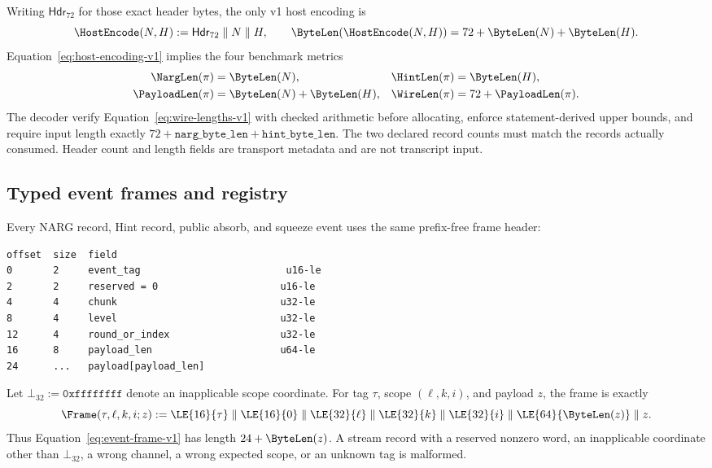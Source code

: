 Writing $\mathsf{Hdr}_{72}$ for those exact header bytes, the only v1 host
encoding is
\begin{equation}
 \HostEncode(N,H)
 :=\mathsf{Hdr}_{72}\parallel N\parallel H,
 \qquad
 \ByteLen(\HostEncode(N,H))=72+\ByteLen(N)+\ByteLen(H).
 \label{eq:host-encoding-v1}
\end{equation}
Equation~\eqref{eq:host-encoding-v1} implies the four benchmark metrics
\begin{equation}
 \begin{aligned}
  \NargLen(\pi)&=\ByteLen(N),&
  \HintLen(\pi)&=\ByteLen(H),\\
  \PayloadLen(\pi)&=\ByteLen(N)+\ByteLen(H),&
  \WireLen(\pi)&=72+\PayloadLen(\pi).
 \end{aligned}
 \label{eq:wire-lengths-v1}
\end{equation}
The decoder \must{} verify Equation~\eqref{eq:wire-lengths-v1} with checked
arithmetic before allocating, enforce statement-derived upper bounds, and
require input length exactly $72+\mathtt{narg\_byte\_len}+
\mathtt{hint\_byte\_len}$.  The two declared record counts must match the
records actually consumed.  Header count and length fields are transport
metadata and are not transcript input.

\subsection{Typed event frames and registry}
\label{sec:wire-events}

Every NARG record, Hint record, public absorb, and squeeze event uses the same
prefix-free frame header:

\begin{lstlisting}[style=wire]
offset  size  field
0       2     event_tag                         u16-le
2       2     reserved = 0                     u16-le
4       4     chunk                            u32-le
8       4     level                            u32-le
12      4     round_or_index                   u32-le
16      8     payload_len                      u64-le
24      ...   payload[payload_len]
\end{lstlisting}

Let $\bot_{32}:=\mathtt{0xffffffff}$ denote an inapplicable scope coordinate.
For tag $\tau$, scope $(\ell,k,i)$, and payload $z$, the frame is exactly
\begin{equation}
 \Frame(\tau,\ell,k,i;z):=
 \LE{16}{\tau}\parallel\LE{16}{0}\parallel
 \LE{32}{\ell}\parallel\LE{32}{k}\parallel\LE{32}{i}\parallel
 \LE{64}{\ByteLen(z)}\parallel z.
 \label{eq:event-frame-v1}
\end{equation}
Thus Equation~\eqref{eq:event-frame-v1} has length $24+\ByteLen(z)$.  A stream
record with a reserved nonzero word, an inapplicable coordinate other than
$\bot_{32}$, a wrong channel, a wrong expected scope, or an unknown tag is
malformed.

